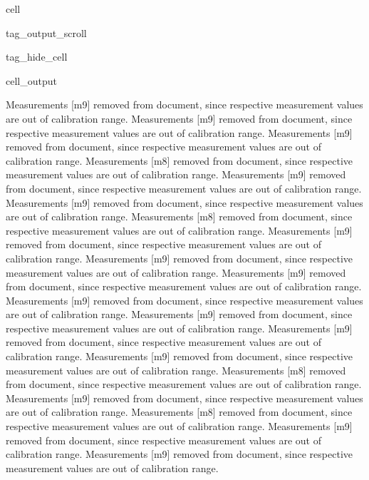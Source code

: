 \documentclass[letterpaper,10pt,english]{jupyterBook}
\begin{document}
\begin{sphinxuseclass}{cell}
\begin{sphinxuseclass}{tag_output_scroll}
\begin{sphinxuseclass}{tag_hide_cell}
\begin{sphinxVerbatimOutput}
\begin{sphinxuseclass}{cell_output}
\begin{sphinxVerbatim}[commandchars=\\\{\}]
Measurements \PYGZsq{}[\PYGZsq{}m9\PYGZsq{}]\PYGZsq{} removed from document, since respective measurement values are out of calibration range.
Measurements \PYGZsq{}[\PYGZsq{}m9\PYGZsq{}]\PYGZsq{} removed from document, since respective measurement values are out of calibration range.
Measurements \PYGZsq{}[\PYGZsq{}m9\PYGZsq{}]\PYGZsq{} removed from document, since respective measurement values are out of calibration range.
Measurements \PYGZsq{}[\PYGZsq{}m8\PYGZsq{}]\PYGZsq{} removed from document, since respective measurement values are out of calibration range.
Measurements \PYGZsq{}[\PYGZsq{}m9\PYGZsq{}]\PYGZsq{} removed from document, since respective measurement values are out of calibration range.
Measurements \PYGZsq{}[\PYGZsq{}m9\PYGZsq{}]\PYGZsq{} removed from document, since respective measurement values are out of calibration range.
Measurements \PYGZsq{}[\PYGZsq{}m8\PYGZsq{}]\PYGZsq{} removed from document, since respective measurement values are out of calibration range.
Measurements \PYGZsq{}[\PYGZsq{}m9\PYGZsq{}]\PYGZsq{} removed from document, since respective measurement values are out of calibration range.
Measurements \PYGZsq{}[\PYGZsq{}m9\PYGZsq{}]\PYGZsq{} removed from document, since respective measurement values are out of calibration range.
Measurements \PYGZsq{}[\PYGZsq{}m9\PYGZsq{}]\PYGZsq{} removed from document, since respective measurement values are out of calibration range.
Measurements \PYGZsq{}[\PYGZsq{}m9\PYGZsq{}]\PYGZsq{} removed from document, since respective measurement values are out of calibration range.
Measurements \PYGZsq{}[\PYGZsq{}m9\PYGZsq{}]\PYGZsq{} removed from document, since respective measurement values are out of calibration range.
Measurements \PYGZsq{}[\PYGZsq{}m9\PYGZsq{}]\PYGZsq{} removed from document, since respective measurement values are out of calibration range.
Measurements \PYGZsq{}[\PYGZsq{}m9\PYGZsq{}]\PYGZsq{} removed from document, since respective measurement values are out of calibration range.
Measurements \PYGZsq{}[\PYGZsq{}m8\PYGZsq{}]\PYGZsq{} removed from document, since respective measurement values are out of calibration range.
Measurements \PYGZsq{}[\PYGZsq{}m9\PYGZsq{}]\PYGZsq{} removed from document, since respective measurement values are out of calibration range.
Measurements \PYGZsq{}[\PYGZsq{}m8\PYGZsq{}]\PYGZsq{} removed from document, since respective measurement values are out of calibration range.
Measurements \PYGZsq{}[\PYGZsq{}m9\PYGZsq{}]\PYGZsq{} removed from document, since respective measurement values are out of calibration range.
Measurements \PYGZsq{}[\PYGZsq{}m9\PYGZsq{}]\PYGZsq{} removed from document, since respective measurement values are out of calibration range.
\end{sphinxVerbatim}


\end{sphinxuseclass}
\end{sphinxVerbatimOutput}
\end{sphinxuseclass}
\end{sphinxuseclass}
\end{sphinxuseclass}
\end{document}
